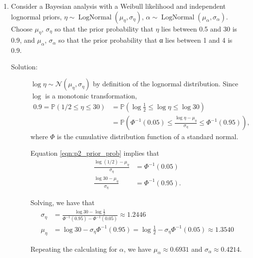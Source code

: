 \documentclass[letterpaper,11pt]{article}
\begin{document}
\begin{enumerate}
  \begin{enumerate}
  \item Consider a Bayesian analysis with a Weibull likelihood and independent
    lognormal priors,
    $\eta \sim \operatorname{LogNormal}\left(\mu_\eta, \sigma_\eta\right)$,
    $\alpha \sim \operatorname{LogNormal}\left(\mu_\alpha,
      \sigma_\alpha\right)$. Choose $\mu_\eta$, $\sigma_\eta$ so that the prior
    probability that $\eta$ lies between 0.5 and 30 is 0.9, and $\mu_\alpha$,
    $\sigma_\alpha$ so that the prior probability that α lies between 1 and 4 is
    0.9.

    \begin{description}
    \item[Solution:]
      $\log\eta \sim \mathcal{N}\left(\mu_\eta, \sigma_\eta\right)$ by
      definition of the lognormal distribution. Since $\log$ is a monotonic
      transformation,
      \begin{align}
        0.9 = \mathbb{P}\left(1/2 \leq \eta \leq 30\right)
        &= \mathbb{P}\left(\log\frac{1}{2} \leq \log\eta \leq \log 30\right) \nonumber\\
        &=
          \mathbb{P}\left(
          \Phi^{-1}\left(0.05\right) \leq
          \frac{\log\eta - \mu_\eta}{\sigma_\eta} \leq
          \Phi^{-1}\left(0.95\right)
          \right),
          \label{eqn:p2_prior_prob}
      \end{align}
      where $\Phi$ is the cumulative distribution function of a standard normal.

      Equation \ref{eqn:p2_prior_prob} implies that
      \begin{align*}
        \frac{\log\left(1/2\right) - \mu_\eta}{\sigma_\eta}
        &= \Phi^{-1}\left(0.05\right) \\
        \frac{\log 30 - \mu_\eta}{\sigma_\eta}
        &= \Phi^{-1}\left(0.95\right).
      \end{align*}

      Solving, we have that
      \begin{align*}
        \sigma_\eta
        &=
          \frac{\log 30 - \log\frac{1}{2}}{\Phi^{-1}\left(0.95\right) - \Phi^{-1}\left(0.05\right)} 
          \approx 1.2446 \\
        \mu_\eta
        &= \log 30 - \sigma_\eta \Phi^{-1}\left(0.95\right) =
          \log \frac{1}{2} - \sigma_\eta\Phi^{-1}\left(0.05\right)
          \approx 1.3540
      \end{align*}

      Repeating the calculating for $\alpha$, we have
      $\mu_\alpha \approx 0.6931$ and $\sigma_\alpha \approx 0.4214$.


\end{description}
\end{enumerate}
\end{enumerate}
\end{document}
